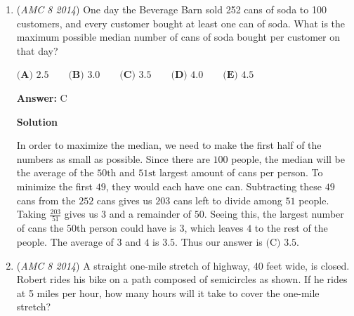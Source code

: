 \begin{enumerate}
 \textbf{Answer: }A



\textbf{Solution 1}

The maximum amount of days any given month can have is $31$, and the smallest two-digit primes are $11, 13,$ and $17$. There are a few different sums that can be deduced from the following numbers, which are $24, 30,$ and $28$, all of which represent the three days. Therefore, since Bethany says that the other two people's uniform numbers are earlier, so that means Caitlin and Ashley's numbers must add up to $24$. Similarly, Caitlin says that the other two people's uniform numbers are later, so the sum must add up to $30$. This leaves $28$ as today's date. From this, Caitlin was referring to the uniform wearers $13$ and $17$, telling us that her number is $11$, giving our solution as $\boxed{(A) 11}$.

 


	\item (\textit{AMC 8 2014}) One day the Beverage Barn sold 252 cans of soda to 100 customers, and every customer bought at least one can of soda. What is the maximum possible median number of cans of soda bought per customer on that day?


 $\textbf{(A) }2.5\qquad\textbf{(B) }3.0\qquad\textbf{(C) }3.5\qquad\textbf{(D) }4.0\qquad\textbf{(E) }4.5$

 \textbf{Answer: }C



\textbf{Solution}

In order to maximize the median, we need to make the first half of the numbers as small as possible. Since there are $100$ people, the median will be the average of the $50\text{th}$ and $51\text{st}$ largest amount of cans per person. To minimize the first $49$, they would each have one can. Subtracting these $49$ cans from the $252$ cans gives us $203$ cans left to divide among $51$ people. Taking $\frac{203}{51}$ gives us $3$ and a remainder of $50$. Seeing this, the largest number of cans the $50$th person could have is $3$, which leaves $4$ to the rest of the people. The average of $3$ and $4$ is $3.5$. Thus our answer is $\boxed{\text{(C) }3.5}$.

 


	\item (\textit{AMC 8 2014}) A straight one-mile stretch of highway, 40 feet wide, is closed. Robert rides his bike on a path composed of semicircles as shown. If he rides at 5 miles per hour, how many hours will it take to cover the one-mile stretch?



\end{enumerate}
